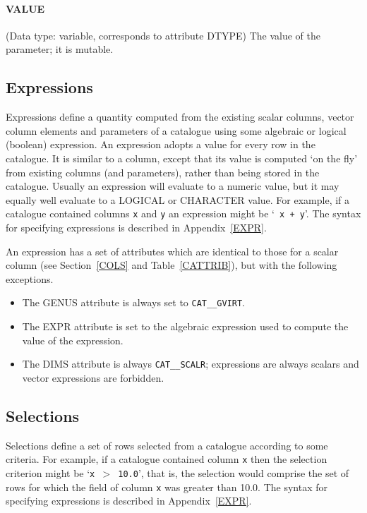 \paragraph{VALUE}
(Data type: variable, corresponds to attribute DTYPE)
The value of the parameter; it is mutable.


\subsection{Expressions}

Expressions define a quantity computed from the existing scalar columns,
vector column elements and parameters of a catalogue using some
algebraic or logical (boolean) expression. An expression adopts a value
for every row in the catalogue. It is similar to a column, except that
its value is computed `on the fly' from existing columns (and
parameters), rather than being stored in the catalogue. Usually an
expression will evaluate to a numeric value, but it may equally well
evaluate to a LOGICAL or CHARACTER value. For example, if a catalogue
contained columns {\tt x} and {\tt y} an expression might be `{\tt
x + y}'. The syntax for specifying expressions is described in
Appendix~\ref{EXPR}.

An expression has a set of attributes which are identical to those for
a scalar column (see Section~\ref{COLS} and Table~\ref{CATTRIB}), but
with the following exceptions.

\begin{itemize}

  \item The GENUS attribute is always set to {\tt CAT\_\_GVIRT}.

  \item The EXPR attribute is set to the algebraic expression used to
   compute the value of the expression.

  \item The DIMS attribute is always {\tt CAT\_\_SCALR}; expressions are
   always scalars and vector expressions are forbidden.

\end{itemize}


\subsection{Selections}

Selections define a set of rows selected from a catalogue according to
some criteria. For example, if a catalogue contained column {\tt x}
then the selection criterion might be `{\tt x $>$ 10.0}', that is, the
selection would comprise the set of rows for which the field of column
{\tt x} was greater than 10.0. The syntax for specifying expressions is
described in Appendix~\ref{EXPR}.

